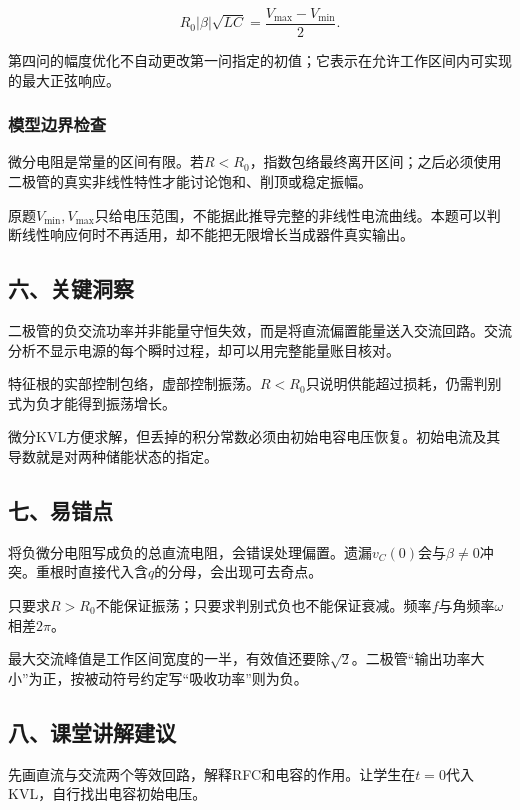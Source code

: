 \documentclass[12pt,a4paper,fontset=fandol]{ctexart}
\begin{document}
\[
R_0|\beta|\sqrt{LC}
=\frac{V_{\max}-V_{\min}}2.
\]

第四问的幅度优化不自动更改第一问指定的初值；它表示在允许工作区间内可实现的最大正弦响应。

\subsubsection{模型边界检查}\label{ux6a21ux578bux8fb9ux754cux68c0ux67e5}

微分电阻是常量的区间有限。若\(R<R_0\)，指数包络最终离开区间；之后必须使用二极管的真实非线性特性才能讨论饱和、削顶或稳定振幅。

原题\(V_{\min},V_{\max}\)只给电压范围，不能据此推导完整的非线性电流曲线。本题可以判断线性响应何时不再适用，却不能把无限增长当成器件真实输出。

\subsection{六、关键洞察}\label{ux516dux5173ux952eux6d1eux5bdf-2}

二极管的负交流功率并非能量守恒失效，而是将直流偏置能量送入交流回路。交流分析不显示电源的每个瞬时过程，却可以用完整能量账目核对。

特征根的实部控制包络，虚部控制振荡。\(R<R_0\)只说明供能超过损耗，仍需判别式为负才能得到振荡增长。

微分KVL方便求解，但丢掉的积分常数必须由初始电容电压恢复。初始电流及其导数就是对两种储能状态的指定。

\subsection{七、易错点}\label{ux4e03ux6613ux9519ux70b9-2}

将负微分电阻写成负的总直流电阻，会错误处理偏置。遗漏\(v_C(0)\)会与\(\beta\neq0\)冲突。重根时直接代入含\(q\)的分母，会出现可去奇点。

只要求\(R>R_0\)不能保证振荡；只要求判别式负也不能保证衰减。频率\(f\)与角频率\(\omega\)相差\(2\pi\)。

最大交流峰值是工作区间宽度的一半，有效值还要除\(\sqrt2\)。二极管``输出功率大小''为正，按被动符号约定写``吸收功率''则为负。

\subsection{八、课堂讲解建议}\label{ux516bux8bfeux5802ux8bb2ux89e3ux5efaux8bae-2}

先画直流与交流两个等效回路，解释RFC和电容的作用。让学生在\(t=0\)代入KVL，自行找出电容初始电压。
\end{document}
